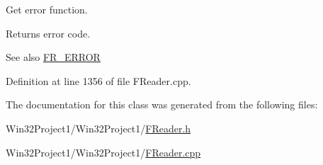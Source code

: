 Get error function. 

\begin{DoxyReturn}{Returns}
error code. 
\end{DoxyReturn}
\begin{DoxySeeAlso}{See also}
\hyperlink{_file_structs_8h_ae183556f32e14e06d49b270ca950d90a}{F\+R\+\_\+\+E\+R\+R\+OR} 
\end{DoxySeeAlso}


Definition at line 1356 of file F\+Reader.\+cpp.



The documentation for this class was generated from the following files\+:\begin{DoxyCompactItemize}
\item 
Win32\+Project1/\+Win32\+Project1/\hyperlink{_f_reader_8h}{F\+Reader.\+h}\item 
Win32\+Project1/\+Win32\+Project1/\hyperlink{_f_reader_8cpp}{F\+Reader.\+cpp}\end{DoxyCompactItemize}
